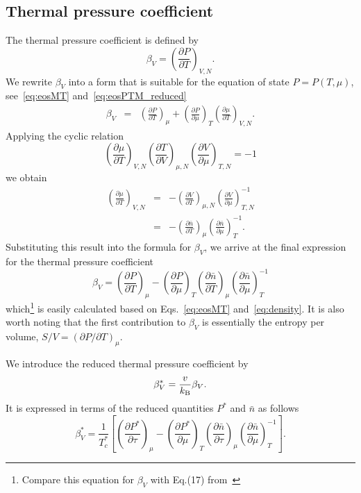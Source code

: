 \subsection{Thermal pressure coefficient}
The thermal pressure coefficient is defined by
\begin{equation}
	\label{def:therm_pres_coef}
	\beta_V = \left( \frac{\partial P}{\partial T} \right)_{V,N}.
\end{equation}
We rewrite $\beta_V$ into a form that is suitable for the equation of state $P=P(T,\mu)$, see~\eqref{eq:eosMT} and~\eqref{eq:eosPTM_reduced}
\begin{eqnarray}
	\beta_V	& = & \left(\frac{\partial P}{\partial T}\right)_{\mu} + \left(\frac{\partial P}{\partial \mu}\right)_T \left(\frac{\partial \mu}{\partial T}\right)_{V, N}.
\end{eqnarray}
Applying the cyclic relation
\begin{equation*}
	\left(\frac{\partial \mu}{\partial T}\right)_{V, N} 
	\left(\frac{\partial T}{\partial V}\right)_{\mu, N}
	\left(\frac{\partial V}{\partial \mu}\right)_{T, N}
	= -1
\end{equation*}
we obtain
\begin{eqnarray*}
	\left(\frac{\partial \mu}{\partial T}\right)_{V, N} 
	& = & 
	- \left(\frac{\partial V}{\partial T}\right)_{\mu, N} 
	\left(\frac{\partial V}{\partial \mu}\right)^{-1}_{T, N} \\
	& = & - \left(\frac{\partial \bar{n}}{\partial T}\right)_{\mu}
	\left(\frac{\partial \bar{n}}{\partial \mu}\right)^{-1}_{T}.		
\end{eqnarray*}
Substituting this result into the formula for $\beta_V$, we arrive at the final expression for the thermal pressure coefficient
\begin{equation}
	\beta_V = \left(\frac{\partial P}{\partial T}\right)_{\mu} 
	- \left(\frac{\partial P}{\partial \mu}\right)_T 
	\left(\frac{\partial \bar{n}}{\partial T}\right)_{\mu}
	\left(\frac{\partial \bar{n}}{\partial \mu}\right)^{-1}_{T}
\end{equation}
which\footnote{Compare this equation for $\beta_V$ with Eq.(17) from~\cite{StrokerMeier2021}} is easily calculated based on Eqs.~\eqref{eq:eosMT} and~\eqref{eq:density}. It is also worth noting that the first contribution to $\beta_V$ is essentially the entropy per volume, $S/V = (\partial P / \partial T)_\mu$.

We introduce the reduced thermal pressure coefficient by
\begin{equation}
	\beta^*_V = \frac{v}{k_{\rm B}}\beta_V.
\end{equation}
It is expressed in terms of the reduced quantities $P^*$ and $\bar{n}$ as follows
\begin{equation}
	\label{eq:beta_star_m}
	\beta^*_V = \frac{1}{T^*_c} 
	\left[ \left(\frac{\partial P^*}{\partial \tau}\right)_{\mu} 
	- \left(\frac{\partial P^*}{\partial \mu}\right)_T 
	\left(\frac{\partial \bar{n}}{\partial \tau}\right)_{\mu}
	\left(\frac{\partial \bar{n}}{\partial \mu}\right)^{-1}_{T} 
	\right].
\end{equation}


